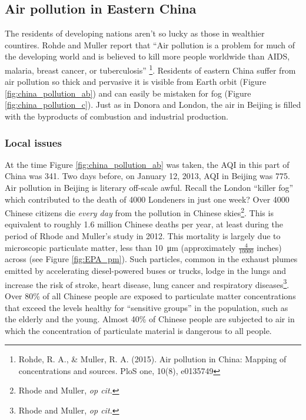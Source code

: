 \subsection{Air pollution in Eastern China}
The residents of developing nations aren't so lucky as those in wealthier countires. Rohde and Muller report that ``Air pollution is a problem for much of the developing world and is believed to kill more
people worldwide than AIDS, malaria, breast cancer, or tuberculosis'' \footnote{Rohde, R. A., \& Muller, R. A. (2015). Air pollution in China: Mapping of concentrations and sources. PloS one, 10(8), e0135749}. Residents of eastern China suffer from air pollution so thick and pervasive it is visible from Earth orbit (Figure \ref{fig:china_pollution_ab}) and can easily be mistaken for fog (Figure \ref{fig:china_pollution_c}). Just as in Donora and London, the air in Beijing is filled with the byproducts of combustion and industrial production.

\subsubsection{Local issues}
At the time Figure \ref{fig:china_pollution_ab} was taken, the AQI in this part of China was 341. Two days before, on January 12, 2013, AQI in Beijing was 775.  Air pollution in Beijing is literary off-scale awful. Recall the London ``killer fog'' which contributed to the death of 4000 Londeners in just one week? Over 4000 Chinese citizens die \emph{every day} from the pollution in Chinese skies\footnote{Rhode and Muller, \textit{op cit.}}. This is equivalent to roughly 1.6 million Chinese deaths per year, at least during the period of Rhode and Muller's study in 2012. This mortality is largely due to microscopic particulate matter, less than \SI{10}{\micro\meter} (approximately $\frac{4}{10000}$ inches) across (see Figure \ref{fig:EPA_pm}). Such particles, common in the exhaust plumes emitted by accelerating diesel-powered buses or trucks, lodge in the lungs and increase the risk of stroke, heart disease, lung cancer and respiratory diseases\footnote{Rhode and Muller, \textit{op cit.}}. Over 80\% of all Chinese people are exposed to particulate matter concentrations that exceed the levels healthy for ``sensitive groups'' in the population, such as the elderly and the young. Almost 40\% of Chinese people are subjected to air in which the concentration of particulate material is dangerous to all people.   

